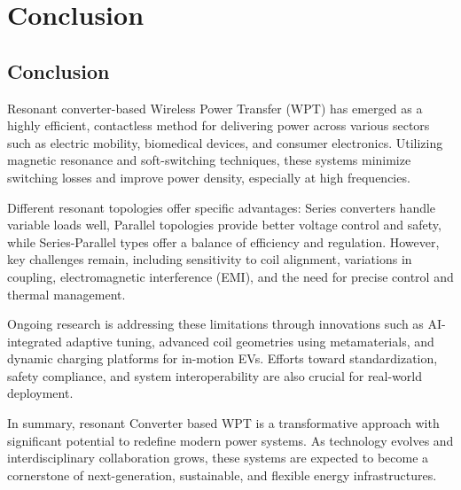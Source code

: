 \documentclass[12pt,a4paper]{report}
\begin{document}
\chapter{Conclusion}

\section{Conclusion}
\vspace{1cm}
\quad Resonant converter-based Wireless Power Transfer (WPT) has emerged as a highly efficient, contactless method for delivering power across various sectors such as electric mobility, biomedical devices, and consumer electronics. Utilizing magnetic resonance and soft-switching techniques, these systems minimize switching losses and improve power density, especially at high frequencies.

\quad Different resonant topologies offer specific advantages: Series converters handle variable loads well, Parallel topologies provide better voltage control and safety, while Series-Parallel types offer a balance of efficiency and regulation. However, key challenges remain, including sensitivity to coil alignment, variations in coupling, electromagnetic interference (EMI), and the need for precise control and thermal management.

\quad Ongoing research is addressing these limitations through innovations such as AI-integrated adaptive tuning, advanced coil geometries using metamaterials, and dynamic charging platforms for in-motion EVs. Efforts toward standardization, safety compliance, and system interoperability are also crucial for real-world deployment.

\quad In summary, resonant Converter based WPT is a transformative approach with significant potential to redefine modern power systems. As technology evolves and interdisciplinary collaboration grows, these systems are expected to become a cornerstone of next-generation, sustainable, and flexible energy infrastructures.

\newpage




\makeatletter
\patchcmd{\thebibliography}{\chapter*{\bibname}}{\chapter*{\bibname}\vspace{2em}}{}{}
\makeatother
\renewcommand{\bibname}{Reference} %
\end{document}
